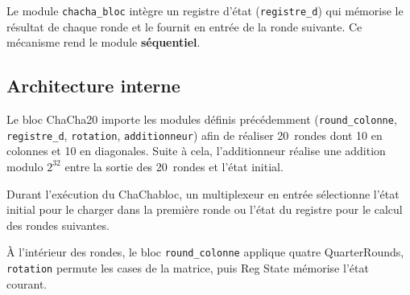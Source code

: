 \documentclass[12pt, a4paper]{article}
\newcommand{\module}[1]{\texttt{\textcolor{maincolor}{#1}}}
\begin{document}
Le module \module{chacha\_bloc} intègre un registre d'état (\module{registre\_d}) qui mémorise
le résultat de chaque ronde et le fournit en entrée de la ronde suivante. Ce mécanisme rend le
module \textbf{séquentiel}.

\subsection{Architecture interne}

Le bloc ChaCha20 importe les modules définis précédemment (\module{round\_colonne},
\module{registre\_d}, \module{rotation}, \module{additionneur}) afin de réaliser 20~rondes dont
10 en colonnes et 10 en diagonales. Suite à cela, l'additionneur réalise une addition modulo
$2^{32}$ entre la sortie des 20~rondes et l'état initial.

Durant l'exécution du ChaChabloc, un multiplexeur en entrée sélectionne l'état initial pour le
charger dans la première ronde ou l'état du registre pour le calcul des rondes suivantes.

À l'intérieur des rondes, le bloc \module{round\_colonne} applique quatre QuarterRounds,
\module{rotation} permute les cases de la matrice, puis Reg State mémorise l'état courant.
\end{document}
